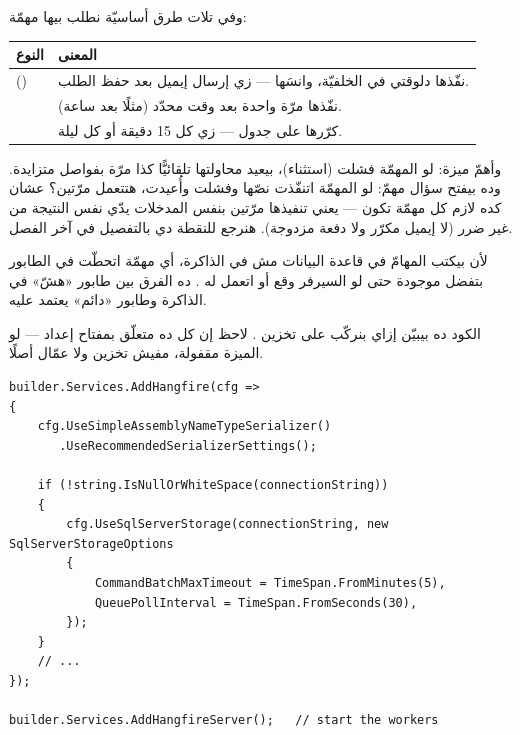 وفي تلات طرق أساسيّة نطلب بيها مهمّة:

\begin{center}
\begin{tabular}{L{3.4cm} L{11.2cm}}
\toprule
النوع & المعنى \\
\midrule
{} () & نفّذها دلوقتي في الخلفيّة، وانسَها — زي إرسال إيميل بعد حفظ الطلب. \\
 & نفّذها مرّة واحدة بعد وقت محدّد (مثلًا بعد ساعة). \\
 & كرّرها على جدول  — زي كل 15 دقيقة أو كل ليلة. \\
\bottomrule
\end{tabular}
\end{center}

وأهمّ ميزة: لو المهمّة فشلت (استثناء)،  بيعيد محاولتها تلقائيًّا كذا مرّة
بفواصل متزايدة. وده بيفتح سؤال مهمّ: لو المهمّة اتنفّذت نصّها وفشلت وأُعيدت، هتتعمل مرّتين؟
عشان كده لازم كل مهمّة تكون  — يعني تنفيذها مرّتين بنفس المدخلات يدّي نفس
النتيجة من غير ضرر (لا إيميل مكرّر ولا دفعة مزدوجة). هنرجع للنقطة دي بالتفصيل في آخر الفصل.

\begin{keyp}
لأن  بيكتب المهامّ في قاعدة البيانات مش في الذاكرة، أي مهمّة اتحطّت في الطابور
بتفضل موجودة حتى لو السيرفر وقع أو اتعمل له . ده الفرق بين طابور «هشّ» في
الذاكرة وطابور «دائم» يعتمد عليه.
\end{keyp}

الكود ده بيبيّن إزاي بنركّب  على تخزين . لاحظ إن كل ده متعلّق
بمفتاح إعداد — لو الميزة مقفولة، مفيش تخزين ولا عمّال أصلًا.

\begin{english}
\begin{lstlisting}[language={[Sharp]C}]
builder.Services.AddHangfire(cfg =>
{
    cfg.UseSimpleAssemblyNameTypeSerializer()
       .UseRecommendedSerializerSettings();

    if (!string.IsNullOrWhiteSpace(connectionString))
    {
        cfg.UseSqlServerStorage(connectionString, new SqlServerStorageOptions
        {
            CommandBatchMaxTimeout = TimeSpan.FromMinutes(5),
            QueuePollInterval = TimeSpan.FromSeconds(30),
        });
    }
    // ...
});

builder.Services.AddHangfireServer();   // start the workers
\end{lstlisting}
\end{english}

